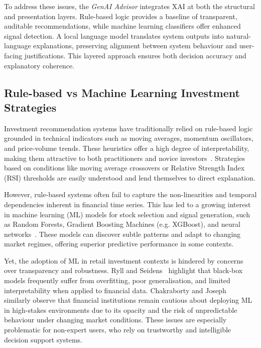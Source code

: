 To address these issues, the \textit{GenAI Advisor} integrates XAI at both the structural and presentation layers. Rule-based logic provides a baseline of transparent, auditable recommendations, while machine learning classifiers offer enhanced signal detection. A local language model translates system outputs into natural-language explanations, preserving alignment between system behaviour and user-facing justifications. This layered approach ensures both decision accuracy and explanatory coherence.

\subsection{Rule-based vs Machine Learning Investment Strategies}

Investment recommendation systems have traditionally relied on rule-based logic grounded in technical indicators such as moving averages, momentum oscillators, and price-volume trends. These heuristics offer a high degree of interpretability, making them attractive to both practitioners and novice investors~\cite{murphy1999technical}. Strategies based on conditions like moving average crossovers or Relative Strength Index (RSI) thresholds are easily understood and lend themselves to direct explanation.

However, rule-based systems often fail to capture the non-linearities and temporal dependencies inherent in financial time series. This has led to a growing interest in machine learning (ML) models for stock selection and signal generation, such as Random Forests, Gradient Boosting Machines (e.g. XGBoost), and neural networks~\cite{fischer2018dlfin}. These models can discover subtle patterns and adapt to changing market regimes, offering superior predictive performance in some contexts.

Yet, the adoption of ML in retail investment contexts is hindered by concerns over transparency and robustness. Ryll and Seidens~\cite{ryll2019mlsurvey} highlight that black-box models frequently suffer from overfitting, poor generalisation, and limited interpretability when applied to financial data. Chakraborty and Joseph~\cite{chakraborty2017boe} similarly observe that financial institutions remain cautious about deploying ML in high-stakes environments due to its opacity and the risk of unpredictable behaviour under changing market conditions. These issues are especially problematic for non-expert users, who rely on trustworthy and intelligible decision support systems.

